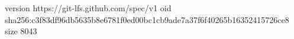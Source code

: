 version https://git-lfs.github.com/spec/v1
oid sha256:c3f83df96db5635b8e6781f0ed00bc1cb9ade7a37f6f40265b16352415726ce8
size 8043
